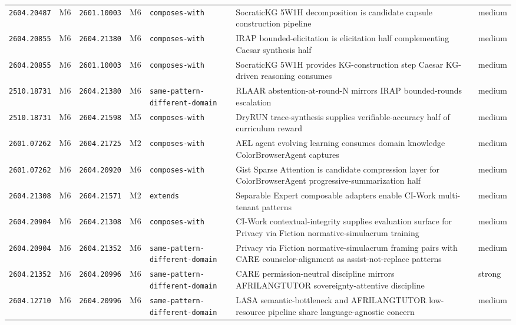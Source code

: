 \documentclass[11pt,letterpaper]{article}
\newcommand{\arxivid}[1]{\texttt{\textcolor{accent}{#1}}}
\begin{document}
\begin{footnotesize}
\begin{longtable}{@{}L{0.09\textwidth} L{0.03\textwidth} L{0.09\textwidth} L{0.03\textwidth} L{0.13\textwidth} L{0.40\textwidth} L{0.06\textwidth}@{}}
\arxivid{2604.20487} & M6 & \arxivid{2601.10003} & M6 & \texttt{\small composes-with} & SocraticKG 5W1H decomposition is candidate capsule construction pipeline & medium \\
\arxivid{2604.20855} & M6 & \arxivid{2604.21380} & M6 & \texttt{\small composes-with} & IRAP bounded-elicitation is elicitation half complementing Caesar synthesis half & medium \\
\arxivid{2604.20855} & M6 & \arxivid{2601.10003} & M6 & \texttt{\small composes-with} & SocraticKG 5W1H provides KG-construction step Caesar KG-driven reasoning consumes & medium \\
\arxivid{2510.18731} & M6 & \arxivid{2604.21380} & M6 & \texttt{\small same-pattern-different-domain} & RLAAR abstention-at-round-N mirrors IRAP bounded-rounds escalation & medium \\
\arxivid{2510.18731} & M6 & \arxivid{2604.21598} & M5 & \texttt{\small composes-with} & DryRUN trace-synthesis supplies verifiable-accuracy half of curriculum reward & medium \\
\arxivid{2601.07262} & M6 & \arxivid{2604.21725} & M2 & \texttt{\small composes-with} & AEL agent evolving learning consumes domain knowledge ColorBrowserAgent captures & medium \\
\arxivid{2601.07262} & M6 & \arxivid{2604.20920} & M6 & \texttt{\small composes-with} & Gist Sparse Attention is candidate compression layer for ColorBrowserAgent progressive-summarization half & medium \\
\arxivid{2604.21308} & M6 & \arxivid{2604.21571} & M2 & \texttt{\small extends} & Separable Expert composable adapters enable CI-Work multi-tenant patterns & medium \\
\arxivid{2604.20904} & M6 & \arxivid{2604.21308} & M6 & \texttt{\small composes-with} & CI-Work contextual-integrity supplies evaluation surface for Privacy via Fiction normative-simulacrum training & medium \\
\arxivid{2604.20904} & M6 & \arxivid{2604.21352} & M6 & \texttt{\small same-pattern-different-domain} & Privacy via Fiction normative-simulacrum framing pairs with CARE counselor-alignment as assist-not-replace patterns & medium \\
\arxivid{2604.21352} & M6 & \arxivid{2604.20996} & M6 & \texttt{\small same-pattern-different-domain} & CARE permission-neutral discipline mirrors AFRILANGTUTOR sovereignty-attentive discipline & strong \\
\arxivid{2604.12710} & M6 & \arxivid{2604.20996} & M6 & \texttt{\small same-pattern-different-domain} & LASA semantic-bottleneck and AFRILANGTUTOR low-resource pipeline share language-agnostic concern & medium \\

\end{longtable}
\end{footnotesize}
\end{document}
